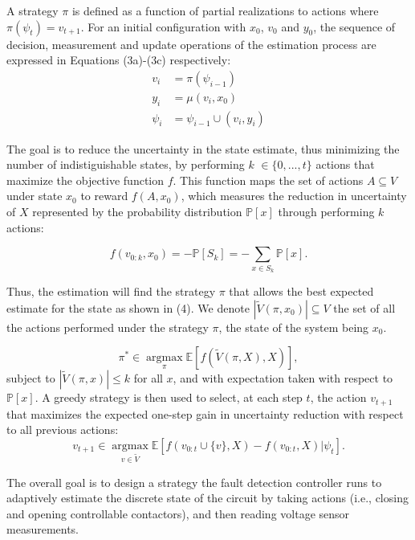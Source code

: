 \documentclass[journal]{IEEEtran}
\begin{document}
A strategy $\pi$ is defined as a function of partial realizations to actions where $\pi(\psi_{t}) =  v_{t+1}$. For an initial configuration with $x_{0}$, $v_{0}$ and $y_{0}$, the sequence of decision, measurement and update operations of the estimation process are expressed in Equations (3a)-(3c) respectively:
\begin{subequations}
\begin{align}
v_{i}&=\pi(\psi_{i-1})\\
y_{i}&=\mu(v_{i}, x_{0})\\
\psi_{i}&=\psi_{i-1}\cup(v_{i}, y_{i})
\end{align}
\end{subequations}

The goal is to reduce the uncertainty in the state estimate, thus minimizing the number of indistiguishable states, by performing $k$ $\in \{0, ...,t\}$ actions that maximize the objective function $f$. This function maps the set of actions $A\subseteq V$ under state $x_{0}$ to reward $f(A, x_{0})$, which measures the reduction in uncertainty of $X$ represented by the probability distribution $\mathbb{P}[x]$ through performing $k$ actions:

\begin{equation}
f(v_{0:k}, x_{0})=-\mathbb{P}[S_{k}]=-\sum_{x\in S_{k}}\mathbb{P}[x]. 
\end{equation}

Thus, the estimation will find the strategy $\pi$ that allows the best expected estimate for the state as shown in (4). We denote $|\tilde{V}(\pi,x_{0})| \subseteq V$ the set of all the actions performed under the strategy $\pi$, the state of the system being $x_{0}$.

\begin{equation}
\pi^{\ast}\in\mathop{\arg\max}\limits_{\pi} \mathbb{E}[f(\tilde{V}(\pi, X), X)], 
\end{equation}
subject to $|\tilde{V}(\pi,x)| \leq k$ for all $x$, and with expectation taken with respect to $\mathbb{P}[x]$. A greedy strategy is then used to select, at each 
step $t$, the action $v_{t+1}$ that maximizes the expected one-step gain in uncertainty reduction with respect to all previous actions:
\begin{equation}
v_{t+1}\in \mathop{\arg \max}\limits_{v\in {\tilde{V}}} \mathbb{E}[f(v_{0:t}\cup\{v\}, X)-f(v_{0:t}, X)\vert \psi_{t}].
\end{equation}


The overall goal is to design a strategy the fault detection controller runs to adaptively estimate the discrete state of the circuit by taking actions
(i.e., closing and opening controllable contactors), and then
reading voltage sensor measurements. 
\end{document}
